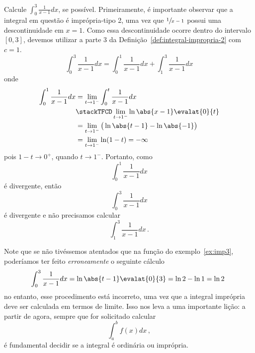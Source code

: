 \begin{example}\label{ex:imp3}
  Calcule \(\int_{0}^3 \frac{1}{x-1} dx\), se possível.
  \solution
  Primeiramente, é importante observar que a integral em questão é
  imprópria-tipo 2, uma vez que $\sfrac{1}{x-1}$ possui uma descontinuidade
  em $x=1$. Como essa descontinuidade ocorre dentro do intervalo $[0, 3]$,
  devemos utilizar a parte 3 da Definição~\ref{def:integral-impropria-2}
  com $c=1$.
  \[
      \int_{0}^3 \frac{1}{x-1} dx
    = \int_{0}^1 \frac{1}{x-1} dx
    + \int_{1}^3 \frac{1}{x-1} dx
  \]
  onde
  \begin{align*}
  \int_{0}^1 \frac{1}{x-1} dx
  & = \lim_{t \to 1^{-}}\int_{0}^t \frac{1}{x-1} dx  \\
  & \stackTFCD \lim_{t \to 1^{-}} \ln\abs{x-1} \evalat{0}{t}  \\
  & = \lim_{t \to 1^{-}}\big(\ln\abs{t-1} - \ln\abs{-1} \big) \\
  & = \lim_{t \to 1^{-}} \ln(1-t) =-\infty
  \end{align*}
  pois $1-t \to 0^+$, quando $t \to 1^{-}$.
  Portanto, como
  \[\int_{0}^1 \frac{1}{x-1} dx\] é divergente, então
  \[\int_{0}^3 \frac{1}{x-1} dx\] é divergente e não precisamos calcular
  \[\int_{1}^3 \frac{1}{x-1} dx \,.\]
\end{example}

Note que se não tivéssemos atentados que na função do exemplo~\ref{ex:imp3},
poderíamos ter feito \emph{erroneamente} o seguinte cálculo
\[
  \int_{0}^3 \frac{1}{x-1} dx
  = \ln\abs{t-1} \evalat{0}{3}
  = \ln 2 - \ln 1
  = \ln 2 \,\,
\]
no entanto, esse procedimento está incorreto, uma vez que a integral
imprópria deve ser calculada em termos de limite. Isso nos leva a
uma importante lição: a partir de agora, sempre que for solicitado
calcular
\[
  \int_{a}^{b} f(x)dx \,,
\]
é fundamental decidir se a integral
é ordinária ou imprópria.

